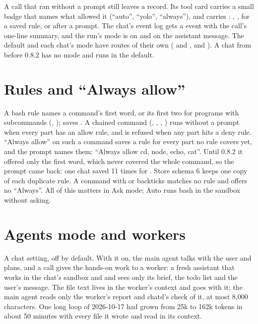 A call that ran without a prompt still leaves a record. Its tool card carries a small badge that names what allowed it (\enquote{auto}, \enquote{yolo}, \enquote{always}), and  carries : , ,  for a saved rule, or  after a prompt. The chat's event log gets a  event with the call's one-line summary, and the run's mode is on  and on the assistant message. The default and each chat's mode have routes of their own ( and , and ). A chat from before 0.8.2 has no mode and runs in the default.

\section{Rules and \enquote{Always allow}}

A bash rule names a command's first word, or its first two for programs with subcommands (, );  saves . A chained command (\code{&&}, \code{||}, \code{;}, \code{|}) runs without a prompt when every part has an allow rule, and is refused when any part hits a deny rule. \enquote{Always allow} on such a command saves a rule for every part no rule covers yet, and the prompt names them: \enquote{Always allow cd, node, echo, cat}. Until 0.8.2 it offered only the first word, which never covered the whole command, so the prompt came back: one chat saved  11 times for . Store schema 6 keeps one copy of each duplicate rule. A command with  or backticks matches no rule and offers no \enquote{Always}. All of this matters in Ask mode; Auto runs bash in the sandbox without asking.

\section{Agents mode and workers}\label{sec:chat-agents}

A chat setting, off by default. With it on, the main agent talks with the user and plans, and a  call gives the hands-on work to a worker: a fresh assistant that works in the chat's sandbox and  and sees only its brief, the todo list and the user's message. The file text lives in the worker's context and goes with it; the main agent reads only the worker's report and chatd's check of it, at most 8{,}000 characters. One long loop of 2026-10-17 had grown from 25k to 162k tokens in about 50 minutes with every file it wrote and read in its context.

